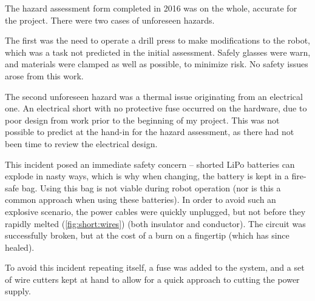 \documentclass[main.tex]{subfiles}
\begin{document}
The hazard assessment form completed in 2016 was on the whole, accurate for the project.
There were two cases of unforeseen hazards.

The first was the need to operate a drill press to make modifications to the robot, which was a task not predicted in the initial assessment.
Safely glasses were warn, and materials were clamped as well as possible, to minimize risk.
No safety issues arose from this work.

The second unforeseen hazard was a thermal issue originating from an electrical one.
An electrical short with no protective fuse occurred on the hardware, due to poor design from work prior to the beginning of my project.
This was not possible to predict at the hand-in for the hazard assessment, as there had not been time to review the electrical design.

This incident posed an immediate safety concern -- shorted LiPo batteries can explode in nasty ways, which is why when changing, the battery is kept in a fire-safe bag.
Using this bag is not viable during robot operation (nor is this a common approach when using these batteries).
In order to avoid such an explosive scenario, the power cables were quickly unplugged, but not before they rapidly melted (\cref{fig:short:wires}) (both insulator and conductor).
The circuit was successfully broken, but at the cost of a burn on a fingertip (which has since healed).

To avoid this incident repeating itself, a fuse was added to the system, and a set of wire cutters kept at hand to allow for a quick approach to cutting the power supply.
\end{document}
